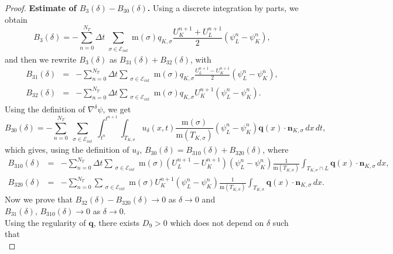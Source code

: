 \documentclass[smallextended]{svjour3}
\begin{document}
\begin{proof}
\textbf{Estimate of $B_{3}(\delta)-B_{30}(\delta)$.} Using a discrete integration by parts, we obtain
\begin{equation*}
B_{3}(\delta) = -\sum_{n=0}^{N_{T}}\Delta t\sum_{\substack{\sigma \in \mathcal{E}_{int}}} \text{m}(\sigma)q_{K,\sigma}\frac{U_{K}^{n+1}+U_{L}^{n+1}}{2}\left(\psi_{L}^{n}-\psi_{K}^{n}\right),
\end{equation*}
and then we rewrite $B_{3}(\delta)$ as $B_{31}(\delta)+B_{32}(\delta)$, with
\begin{eqnarray*}
B_{31}(\delta)&=&-\sum_{n=0}^{N_{T}}\Delta t\sum_{\substack{\sigma \in \mathcal{E}_{int}}} \text{m}(\sigma)q_{K,\sigma}\frac{U_{L}^{n+1}-U_{K}^{n+1}}{2}\left(\psi_{L}^{n}-\psi_{K}^{n}\right),\\
B_{32}(\delta)&=& -\sum_{n=0}^{N_{T}}\Delta t\sum_{\substack{\sigma \in \mathcal{E}_{int}}} \text{m}(\sigma)q_{K,\sigma}U^{n+1}_{K}\left(\psi_{L}^{n}-\psi_{K}^{n}\right).
\end{eqnarray*}
Using the definition of $\nabla^{\delta}\psi$, we get
\begin{equation*}
B_{30}(\delta)=-\sum_{n=0}^{N_{T}}\sum_{\substack{\sigma \in \mathcal{E}_{int}}}\int_{t^{n}}^{t^{n+1}}\int_{T_{K,\sigma}}u_{\delta}(x,t)\frac{\text{m}(\sigma)}{\text{m}(T_{K,\sigma})}\left(\psi_{L}^{n}-\psi_{K}^{n}\right)\textbf{q}(x)\cdot \textbf{n}_{K,\sigma}\, dx \, dt,
\end{equation*}
which gives, using the definition of $u_{\delta}$, $B_{30}(\delta)=B_{310}(\delta)+B_{320}(\delta)$, where
\begin{eqnarray*}
B_{310}(\delta) &=& -\sum_{n=0}^{N_{T}}\Delta t\sum_{\substack{\sigma \in \mathcal{E}_{int}}}\text{m}(\sigma)\left(U^{n+1}_{L}-U^{n+1}_{K}\right)\left(\psi_{L}^{n}-\psi^{n}_{K}\right)\frac{1}{\text{m}(T_{K,\sigma})}\int_{T_{K,\sigma}\cap L}\textbf{q}(x)\cdot \textbf{n}_{K,\sigma}\, dx,\\
B_{320}(\delta) &= & -\sum_{n=0}^{N_{T}}\sum_{\substack{\sigma \in \mathcal{E}_{int}}}\text{m}(\sigma)U_{K}^{n+1}\left(\psi_{L}^{n}-\psi^{n}_{K}\right)\frac{1}{\text{m}(T_{K,\sigma})}\int_{T_{K,\sigma}}\textbf{q}(x)\cdot \textbf{n}_{K,\sigma}\, dx.
\end{eqnarray*}
Now we prove that $B_{32}(\delta)-B_{320}(\delta) \rightarrow 0$ as $\delta \rightarrow 0$ and $B_{31}(\delta), \, B_{310}(\delta)\rightarrow 0$ as $\delta \rightarrow 0$.\\
Using the regularity of $\textbf{q}$, there exists $D_{9}>0$ which does not depend on $\delta$ such that 
\begin{equation*}

\end{equation*}
\end{proof}
\end{document}
